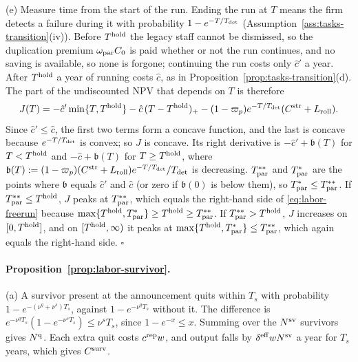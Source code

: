 (e) Measure time from the start of the run. Ending the run at $T$ means the firm detects a failure during it with probability $1-e^{-T/T_{\rm det}}$ (Assumption~\ref{ass:tasks-transition}(iv)). Before $T^{\rm hold}$ the legacy staff cannot be dismissed, so the duplication premium $\omega_{\rm par}C_0$ is paid whether or not the run continues, and no saving is available, so none is forgone; continuing the run costs only $\hat c'$ a year. After $T^{\rm hold}$ a year of running costs $\hat c$, as in Proposition~\ref{prop:tasks-transition}(d). The part of the undiscounted NPV that depends on $T$ is therefore
\[
J(T)=-\hat c'\min\{T,T^{\rm hold}\}-\hat c\,(T-T^{\rm hold})_+-(1-\varpi_p)e^{-T/T_{\rm det}}(C^{\rm str}+L_{\rm roll}).
\]
Since $\hat c'\le\hat c$, the first two terms form a concave function, and the last is concave because $e^{-T/T_{\rm det}}$ is convex; so $J$ is concave. Its right derivative is $-\hat c'+\mathfrak b(T)$ for $T<T^{\rm hold}$ and $-\hat c+\mathfrak b(T)$ for $T\ge T^{\rm hold}$, where $\mathfrak b(T):=(1-\varpi_p)(C^{\rm str}+L_{\rm roll})e^{-T/T_{\rm det}}/T_{\rm det}$ is decreasing. $T^{**}_{\rm par}$ and $T^*_{\rm par}$ are the points where $\mathfrak b$ equals $\hat c'$ and $\hat c$ (or zero if $\mathfrak b(0)$ is below them), so $T^*_{\rm par}\le T^{**}_{\rm par}$. If $T^{**}_{\rm par}\le T^{\rm hold}$, $J$ peaks at $T^{**}_{\rm par}$, which equals the right-hand side of \eqref{eq:labor-freerun} because $\max\{T^{\rm hold},T^*_{\rm par}\}\ge T^{\rm hold}\ge T^{**}_{\rm par}$. If $T^{**}_{\rm par}>T^{\rm hold}$, $J$ increases on $[0,T^{\rm hold}]$, and on $[T^{\rm hold},\infty)$ it peaks at $\max\{T^{\rm hold},T^*_{\rm par}\}\le T^{**}_{\rm par}$, which again equals the right-hand side. $\square$

\paragraph{Proposition~\ref{prop:labor-survivor}.}
(a) A survivor present at the announcement quits within $T_s$ with probability $1-e^{-(\nu^q+\nu^s)T_s}$, against $1-e^{-\nu^qT_s}$ without it. The difference is $e^{-\nu^qT_s}(1-e^{-\nu^sT_s})\le\nu^sT_s$, since $1-e^{-x}\le x$. Summing over the $N^{\rm sv}$ survivors gives $N^{\rm q}$. Each extra quit costs $c^{\rm rep}w$, and output falls by $\delta^{\rm eff}wN^{\rm sv}$ a year for $T_s$ years, which gives $C^{\rm surv}$.


